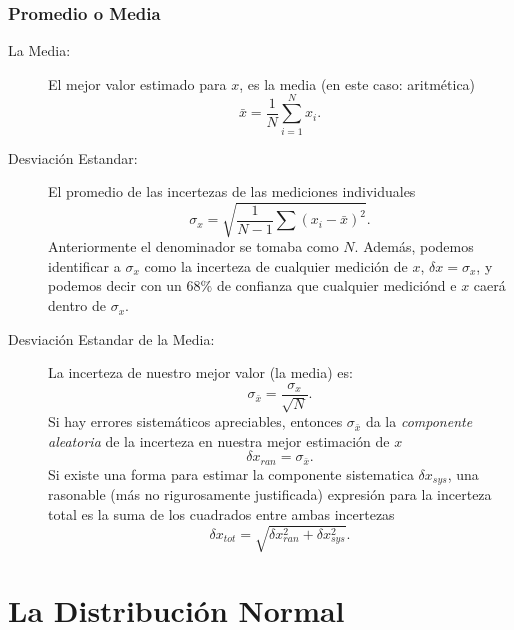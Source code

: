 \subsection{Promedio o Media}
\begin{tcolorbox}
	\begin{description}
		\item[La Media: ] El mejor valor estimado para $x$, es la media (en este caso: aritmética)
			\begin{equation}
				\bar{x} = \frac{1}{N} \sum _{i=1} ^N x_i.
			\end{equation}
		\item[Desviación Estandar: ] El promedio de las incertezas de las mediciones individuales
			\begin{equation}
				\sigma _x = \sqrt{\frac{1}{N - 1} \sum (x_i - \bar{x})^2}.
			\end{equation}
		Anteriormente el denominador se tomaba como $N$. Además, podemos identificar a $\sigma _x$ como la incerteza de cualquier medición de $x$, $\delta x = \sigma _x$, y podemos decir con un $68\%$ de confianza que cualquier mediciónd e $x$ caerá dentro de $\sigma _x$.
		\item[Desviación Estandar de la Media: ] La incerteza de nuestro mejor valor (la media) es:
			\begin{equation}
				\sigma _{\bar{x}} = \frac{\sigma _x}{\sqrt{N}}.
			\end{equation}
		Si hay errores sistemáticos apreciables, entonces $\sigma _{\bar{x}}$ da la \textit{componente aleatoria} de la incerteza en nuestra mejor estimación de $x$
			\begin{equation}
				\delta x_{ran} = \sigma _{\bar{x}}.
			\end{equation}
		Si existe una forma para estimar la componente sistematica $\delta x_{sys}$, una rasonable (más no rigurosamente justificada) expresión para la incerteza total es la suma de los cuadrados entre ambas incertezas
			\begin{equation}
				\delta x_{tot} = \sqrt{\delta x_{ran}^2 + \delta x_{sys}^2}.
			\end{equation}
	\end{description}
\end{tcolorbox}


\chapter{La Distribución Normal}
